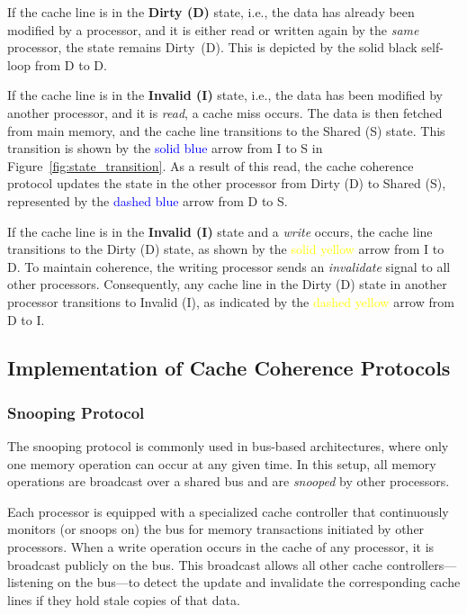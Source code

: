 \documentclass[12pt]{book}
\begin{document}
If the cache line is in the \textbf{Dirty (D)} state, i.e., the data has already been modified by a processor, and it is either read or written again by the \textit{same} processor, the state remains Dirty~(D).  
This is depicted by the solid black self-loop from D to D.

If the cache line is in the \textbf{Invalid (I)} state, i.e., the data has been modified by another processor, and it is \textit{read}, a cache miss occurs. The data is then fetched from main memory, and the cache line transitions to the Shared (S) state.  
This transition is shown by the \textcolor{blue}{solid blue} arrow from I to S in Figure~\ref{fig:state_transition}.  
As a result of this read, the cache coherence protocol updates the state in the other processor from Dirty (D) to Shared (S), represented by the \textcolor{blue}{dashed blue} arrow from D to S.

If the cache line is in the \textbf{Invalid (I)} state and a \textit{write} occurs, the cache line transitions to the Dirty (D) state, as shown by the \textcolor{yellow}{solid yellow} arrow from I to D.  
To maintain coherence, the writing processor sends an \textit{invalidate} signal to all other processors. Consequently, any cache line in the Dirty (D) state in another processor transitions to Invalid (I), as indicated by the \textcolor{yellow}{dashed yellow} arrow from D to I.

\subsection{Implementation of Cache Coherence Protocols}
\subsubsection{Snooping Protocol}

The snooping protocol is commonly used in bus-based architectures, where only one memory operation can occur at any given time. In this setup, all memory operations are broadcast over a shared bus and are \textit{snooped} by other processors.

Each processor is equipped with a specialized cache controller that continuously monitors (or snoops on) the bus for memory transactions initiated by other processors. When a write operation occurs in the cache of any processor, it is broadcast publicly on the bus. This broadcast allows all other cache controllers—listening on the bus—to detect the update and invalidate the corresponding cache lines if they hold stale copies of that data.
\end{document}
